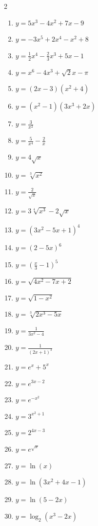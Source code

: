 \documentclass[11pt,a4paper]{article}
\begin{document}
\pagestyle{empty}

\begin{multicols}{2}
\begin{enumerate}[label=\textbf{\arabic*.}, leftmargin=2em, itemsep=10pt]
    \item $y = 5x^3 - 4x^2 + 7x - 9$
    \item $y = -3x^5 + 2x^4 - x^2 + 8$
    \item $y = \frac{1}{2}x^4 - \frac{2}{3}x^3 + 5x - 1$
    \item $y = x^6 - 4x^3 + \sqrt{2}x - \pi$
    \item $y = (2x - 3)(x^2 + 4)$
    \item $y = (x^2 - 1)(3x^3 + 2x)$
    \item $y = \frac{3}{x^2}$
    \item $y = \frac{5}{x^4} - \frac{2}{x}$
    \item $y = 4\sqrt{x}$
    \item $y = \sqrt[3]{x^2}$
    \item $y = \frac{2}{\sqrt{x}}$
    \item $y = 3\sqrt[4]{x^3} - 2\sqrt{x}$
    \item $y = (3x^2 - 5x + 1)^4$
    \item $y = (2 - 5x)^6$
    \item $y = \left(\frac{x}{3} - 1\right)^5$
    \item $y = \sqrt{4x^2 - 7x + 2}$
    \item $y = \sqrt{1 - x^2}$
    \item $y = \sqrt[3]{2x^3 - 5x}$
    \item $y = \frac{1}{3x^2 - 4}$
    \item $y = \frac{1}{(2x+1)^3}$
    \item $y = e^x + 5^x$
    \item $y = e^{3x - 2}$
    \item $y = e^{-x^2}$
    \item $y = 3^{x^2 + 1}$
    \item $y = 2^{4x - 3}$
    \item $y = e^{\sqrt{x}}$
    \item $y = \ln(x)$
    \item $y = \ln(3x^2 + 4x - 1)$
    \item $y = \ln(5 - 2x)$
    \item $y = \log_2(x^3 - 2x)$
\end{enumerate}
\end{multicols}
\end{document}
